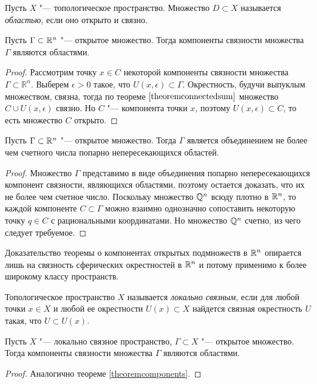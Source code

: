 \begin{definition}
	Пусть $X$ "--- топологическое пространство. Множество $D \subset X$ называется \textit{областью}, если оно открыто и связно.
\end{definition}

\begin{theorem}\label{theoremcomponents}
	Пусть $\Gamma \subset \mathbb{R}^n$ "--- открытое множество. Тогда компоненты связности множества $\Gamma$ являются областями.
\end{theorem}

\begin{proof}
	Рассмотрим точку $x\in C$ некоторой компоненты связности множества $\Gamma \subset \mathbb{R}^n$. Выберем $\epsilon > 0$ такое, что $U(x,\epsilon) \subset \Gamma$. Окрестность, будучи выпуклым множеством, связна, тогда по теореме $\ref{theoremconnectedsum}$ множество $C \cup U(x,\epsilon)$ связно. Но $C$ "--- компонента точки $x$, поэтому $U(x,\epsilon) \subset C$, то есть множество $C$ открыто.
\end{proof}

\begin{corollary}
	Пусть $\Gamma \subset \mathbb{R}^n$ "--- открытое множество. Тогда $\Gamma$ является объединением не более чем счетного числа попарно непересекающихся областей.
\end{corollary}

\begin{proof}
	Множество $\Gamma$ представимо в виде объединения попарно непересекающихся компонент связности, являющихся областями, поэтому остается доказать, что их не более чем счетное число. Поскольку множество $\mathbb{Q}^n$ всюду плотно в $\mathbb{R}^n$, то каждой компоненте $C \subset \Gamma$ можно взаимно однозначно сопоставить некоторую точку $q \in C$ с рациональными координатами. Но множество $\mathbb{Q}^n$ счетно, из чего следует требуемое.
\end{proof}

\begin{note}
	Доказательство теоремы о компонентах открытых подмножеств в $\mathbb{R}^n$ опирается лишь на связность сферических окрестностей в $\mathbb{R}^n$ и потому применимо к более широкому классу пространств.
\end{note}

\begin{definition}
	Топологическое пространство $X$ называется \textit{локально связным}, если для любой точки $x \in X$ и любой ее окрестности $U(x) \subset X$ найдется связная окрестность $U$ такая, что $U \subset U(x)$.
\end{definition}

\begin{theorem}
	Пусть $X$ "--- локально связное пространство, $\Gamma \subset X$ "--- открытое множество. Тогда компоненты связности множества $\Gamma$ являются областями.
\end{theorem}

\begin{proof}
	Аналогично теореме \ref{theoremcomponents}.
\end{proof}
